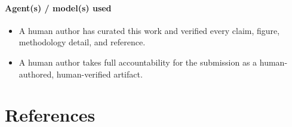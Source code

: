 \documentclass{article}
\begin{document}
\paragraph{Agent(s) / model(s) used}


\begin{itemize}
  \item[$\square$] A human author has curated this work and verified every claim,
    figure, methodology detail, and reference.
  \item[$\square$] A human author takes full accountability for the submission as
    a human-authored, human-verified artifact.
\end{itemize}


\section{References}
\end{document}
